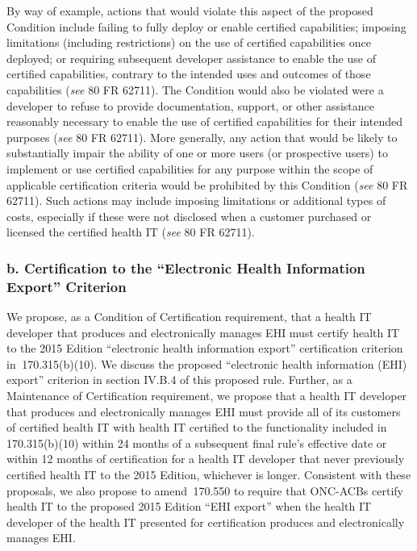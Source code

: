 \documentclass[twoside,11pt]{article}
\begin{document}
          By way of example, actions that would violate this aspect of the proposed Condition include failing to fully deploy or enable certified capabilities; imposing limitations (including restrictions) on the use of certified capabilities once deployed; or requiring subsequent developer assistance to enable the use of certified capabilities, contrary to the intended uses and outcomes of those capabilities (\emph{see} 80 FR 62711). The Condition would also be violated were a developer to refuse to provide documentation, support, or other assistance reasonably necessary to enable the use of certified capabilities for their intended purposes (\emph{see} 80 FR 62711). More generally, any action that would be likely to substantially impair the ability of one or more users (or prospective users) to implement or use certified capabilities for any purpose within the scope of applicable certification criteria would be prohibited by this Condition (\emph{see} 80 FR 62711). Such actions may include imposing limitations or additional types of costs, especially if these were not disclosed when a customer purchased or licensed the certified health IT (\emph{see} 80 FR 62711).


          \subsubsection{b. Certification to the “Electronic Health Information Export” Criterion}

          We propose, as a Condition of Certification requirement, that a health IT developer that produces and electronically manages EHI must certify health IT to the 2015 Edition “electronic health information export” certification criterion in \textsection{} 170.315(b)(10). We discuss the proposed “electronic health information (EHI) export” criterion in section IV.B.4 of this proposed rule. Further, as a Maintenance of Certification requirement, we propose that a health IT developer that produces and electronically manages EHI must provide all of its customers of certified health IT with health IT certified to the functionality included in \textsection{} 170.315(b)(10) within 24 months of a subsequent final rule's effective date or within 12 months of certification for a health IT developer that never previously certified health IT to the 2015 Edition, whichever is longer. Consistent with these proposals, we also propose to amend \textsection{} 170.550 to require that ONC-ACBs certify health IT to the proposed 2015 Edition “EHI export” when the health IT developer of the health IT presented for certification produces and electronically manages EHI.
\end{document}
